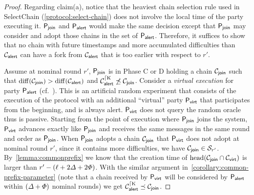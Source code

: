 \begin{proof}
    Regarding claim(a), notice that the heaviest chain selection rule used in \textsf{SelectChain} (\cref{protocol:select-chain}) does not involve the local time \localTime of the party executing it.
    $\mathsf{P}_{\mathsf{join}}$ and $\mathsf{P}_{\mathsf{alert}}$ would make the same decision except that $\mathsf{P}_{\mathsf{join}}$ may consider and adopt those chains in the \futureChains set of $\mathsf{P}_{\mathsf{alert}}$.
    Therefore, it suffices to show that no chain with future timestamps and more accumulated difficulties than $\mathcal{C}_{\mathsf{alert}}$ can have a fork from $\mathcal{C}_{\mathsf{alert}}$ that is too earlier with respect to $r'$.

    Assume at nominal round $r'$, $\mathsf{P}_{\mathsf{join}}$ is in Phase C or D holding a chain $\mathcal{C}_{\mathsf{join}}$ such that $\mathrm{diff}(\mathcal{C}_{\mathsf{join}}) > \mathrm{diff}(\mathcal{C}_{\mathsf{alert}})$ and $\mathcal{C}_{\mathsf{alert}}^{\lceil \mathrm{K}} \not\preceq \mathcal{C}_{\mathsf{join}}$.
    Consider a \emph{virtual execution} for party $\mathsf{P}_{\mathsf{alert}}$ (cf.~\cite{CCS:BGKRZ18}).
    This is an artificial random experiment that consists of the execution of the protocol with an additional ``virtual'' party $\mathsf{P}_{\mathsf{virt}}$ that participates from the beginning, and is always alert.
    $\mathsf{P}_{\mathsf{virt}}$ does not query the random oracle thus is passive.
    Starting from the point of execution where $\mathsf{P}_{\mathsf{join}}$ joins the system, $\mathsf{P}_{\mathsf{virt}}$ advances exactly like $\mathsf{P}_{\mathsf{join}}$ and receives the same messages in the same round and order as $\mathsf{P}_{\mathsf{join}}$.
    When $\mathsf{P}_{\mathsf{join}}$ adopts a chain $\mathcal{C}_{\mathsf{join}}$ that $\mathsf{P}_{\mathsf{virt}}$ does not adopt at nominal round $r'$, since it contains more difficulties, we have $\mathcal{C}_{\mathsf{join}} \in \mathcal{S}_{r'}$.
    By~\cref{lemma:commonprefix} we know that the creation time of $\mathrm{head}(\mathcal{C}_{\mathsf{join}} \cap \mathcal{C}_{\mathsf{virt}})$ is larger than $r' - (\ell + 2\varDelta + 2\varPhi)$.
    With the similar argument in~\cref{corollary:common-prefix-parameter} (note that a chain received by $\mathsf{P}_{\mathsf{virt}}$ will be considered by $\mathsf{P}_{\mathsf{alert}}$ within $(\varDelta + \varPhi)$ nominal rounds) we get $\mathcal{C}_{\mathsf{alert}}^{\lceil \mathrm{K}} \preceq \mathcal{C}_{\mathsf{join}}$.


\end{proof}

